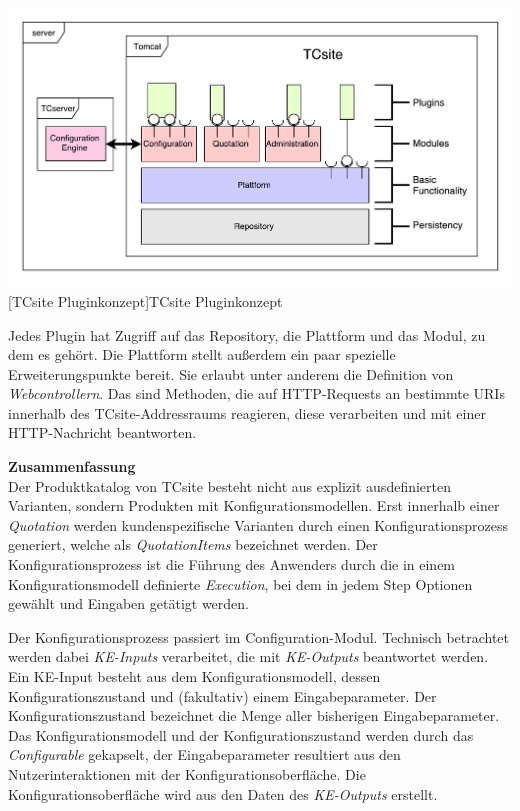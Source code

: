 \documentclass[11pt, a4paper, titlepage, listof=totoc, bibliography=totoc, index=totoc, twoside, openright, headings=normal, draft]{scrreprt}
\begin{document}
\vspace{1em}
\begin{minipage}{\linewidth}
	\centering
	\includegraphics[width=0.8\linewidth]{Abbildungen/tcsiteLowLevelExtensions.pdf}
	[TCsite Pluginkonzept]{TCsite Pluginkonzept}
	\label{fig:tcsiteLowLevelExtensions}
\end{minipage}
\vspace{0.3em}

Jedes Plugin hat Zugriff auf das Repository, die Plattform und das Modul, zu dem es gehört. Die Plattform stellt außerdem ein paar spezielle Erweiterungspunkte bereit. Sie erlaubt unter anderem die Definition von \emph{Webcontrollern}. Das sind Methoden, die auf HTTP-Requests an bestimmte URIs innerhalb des TCsite-Addressraums reagieren, diese verarbeiten und mit einer HTTP-Nachricht beantworten.

\textbf{Zusammenfassung}\\
Der Produktkatalog von TCsite besteht nicht aus explizit ausdefinierten Varianten, sondern Produkten mit Konfigurationsmodellen. Erst innerhalb einer \emph{Quotation} werden kundenspezifische Varianten durch einen Konfigurationsprozess generiert, welche als \emph{QuotationItems} bezeichnet werden. Der Konfigurationsprozess ist die Führung des Anwenders durch die in einem Konfigurationsmodell definierte \emph{Execution}, bei dem in jedem Step Optionen gewählt und Eingaben getätigt werden.

Der Konfigurationsprozess passiert im Configuration-Modul. Technisch betrachtet werden dabei \emph{KE-Inputs} verarbeitet, die mit \emph{KE-Outputs} beantwortet werden. Ein KE-Input besteht aus dem Konfigurationsmodell, dessen Konfigurationszustand und (fakultativ) einem Eingabeparameter. Der Konfigurationszustand bezeichnet die Menge aller bisherigen Eingabeparameter. Das Konfigurationsmodell und der Konfigurationszustand werden durch das \emph{Configurable} gekapselt, der Eingabeparameter resultiert aus den Nutzerinteraktionen mit der Konfigurationsoberfläche. Die Konfigurationsoberfläche wird aus den Daten des \emph{KE-Outputs} erstellt.
\end{document}
